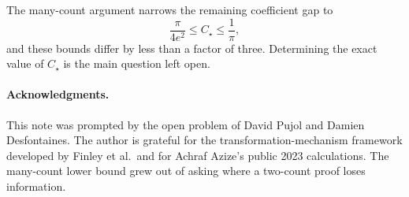 \documentclass[11pt]{article}
\theoremstyle{definition}
\begin{document}
The many-count argument narrows the remaining coefficient gap to
\[
  \frac{\pi}{4e^2}\le C_\star\le\frac1\pi,
\]
and these bounds differ by less than a factor of three. Determining the exact value of $C_\star$ is the main question left open.

\paragraph{Acknowledgments.}
This note was prompted by the open problem of David Pujol and Damien Desfontaines. The author is grateful for the transformation-mechanism framework developed by Finley et al.\ and for Achraf Azize's public 2023 calculations. The many-count lower bound grew out of asking where a two-count proof loses information.

\begingroup
\raggedright


\endgroup
\end{document}
